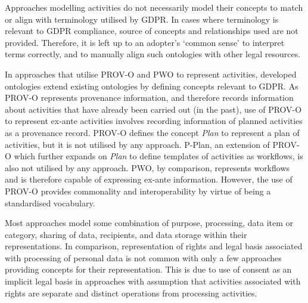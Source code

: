 Approaches modelling activities do not necessarily model their concepts to match or align with terminology utilised by GDPR. In cases where terminology is relevant to GDPR compliance, source of concepts and relationships used are not provided. Therefore, it is left up to an adopter's `common sense' to interpret terms correctly, and to manually align such ontologies with other legal resources.

In approaches that utilise PROV-O and PWO to represent activities, developed ontologies extend existing ontologies by defining concepts relevant to GDPR. As PROV-O represents provenance information, and therefore records information about activities that have already been carried out (in the past), use of PROV-O to represent ex-ante activities involves recording information of planned activities as a provenance record. PROV-O defines the concept \textit{Plan} to represent a plan of activities, but it is not utilised by any approach. P-Plan, an extension of PROV-O which further expands on \textit{Plan} to define templates of activities as workflows, is also not utilised by any approach. PWO, by comparison, represents workflows and is therefore capable of expressing ex-ante information. However, the use of PROV-O provides commonality and interoperability by virtue of being a standardised vocabulary.

Most approaches model some combination of purpose, processing, data item or category, sharing of data, recipients, and data storage within their representations. In comparison, representation of rights and legal basis associated with processing of personal data is not common with only a few approaches providing concepts for their representation. This is due to use of consent as an implicit legal basis in approaches with assumption that activities associated with rights are separate and distinct operations from processing activities. 

